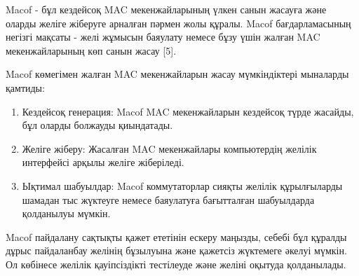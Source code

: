 \begin{multicols}{2}
Macof - бұл кездейсоқ MAC мекенжайларының үлкен санын жасауға және
оларды желіге жіберуге арналған пәрмен жолы құралы. Macof
бағдарламасының негізгі мақсаты - желі жұмысын баяулату немесе бұзу үшін
жалған MAC мекенжайларының көп санын жасау {[}5{]}.

Macof көмегімен жалған MAC мекенжайларын жасау мүмкіндіктері мыналарды
қамтиды:

\begin{enumerate}
\def\labelenumi{\arabic{enumi}.}
\item
  Кездейсоқ генерация: Macof MAC мекенжайларын кездейсоқ түрде жасайды,
  бұл оларды болжауды қиындатады.
\item
  Желіге жіберу: Жасалған MAC мекенжайлары компьютердің желілік
  интерфейсі арқылы желіге жіберіледі.
\item
  Ықтимал шабуылдар: Macof коммутаторлар сияқты желілік құрылғыларды
  шамадан тыс жүктеуге немесе баяулатуға бағытталған шабуылдарда
  қолданылуы мүмкін.
\end{enumerate}

Macof пайдалану сақтықты қажет ететінін ескеру маңызды, себебі бұл
құралды дұрыс пайдаланбау желінің бұзылуына және қажетсіз жүктемеге
әкелуі мүмкін. Ол көбінесе желілік қауіпсіздікті тестілеуде және желіні
оқытуда қолданылады.
\end{multicols}

